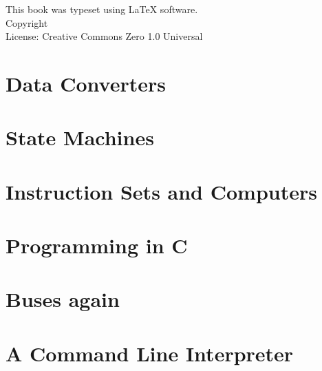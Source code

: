 \documentclass{book}
\makeatletter
\newcommand{\booklicense}{Creative Commons Zero 1.0 Universal}
\newcommand{\bookauthor}{\@author}
\makeatother
\begin{document}
\thispagestyle{empty}

\begin{flushleft}
\vspace*{\fill}
This book was typeset using \LaTeX{} software.\\
\vspace{\fill}
Copyright \textcopyright{} \the\year{}  \bookauthor\\
License: \booklicense
\end{flushleft}

\addtocounter{page}{2}



\setcounter{tocdepth}{3}
\tableofcontents

\mainmatter









\chapter{Data Converters}
\chapter{State Machines}
\chapter{Instruction Sets and Computers}
\chapter{Programming in C}
\chapter{Buses again}
\chapter{A Command Line Interpreter}
\end{document}
